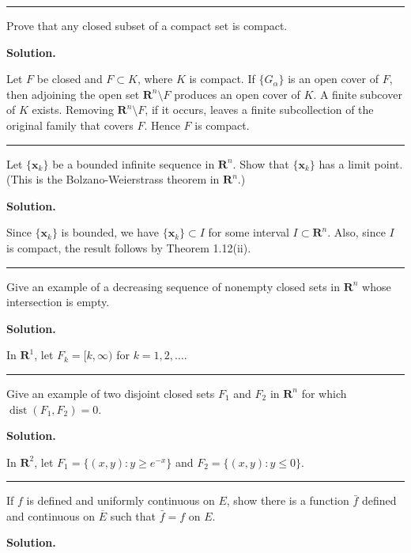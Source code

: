 \documentclass[12pt]{article}
\theoremstyle{definition}
\begin{document}
\bigskip\noindent\hrule\bigskip

Prove that any closed subset of a compact set is compact.

\smallskip
\noindent\textbf{Solution.}\quad

Let $F$ be closed and $F\subset K$, where $K$ is compact.  If $\{G_\alpha\}$ is an open cover of $F$, then adjoining the open set $\mathbf{R}^n\setminus F$ produces an open cover of $K$.  A finite subcover of $K$ exists.  Removing $\mathbf{R}^n\setminus F$, if it occurs, leaves a finite subcollection of the original family that covers $F$.  Hence $F$ is compact.



\bigskip\noindent\hrule\bigskip

Let $\{\mathbf{x}_k\}$ be a bounded infinite sequence in $\mathbf{R}^n$. Show that $\{\mathbf{x}_k\}$ has a limit point. (This is the Bolzano-Weierstrass theorem in $\mathbf{R}^n$.)

\smallskip
\noindent\textbf{Solution.}\quad

Since $\{\mathbf{x}_k\}$ is bounded, we have $\{\mathbf{x}_k\}\subset I$ for some interval $I\subset\mathbf{R}^n$. Also, since $I$ is compact, the result follows by Theorem 1.12(ii).



\bigskip\noindent\hrule\bigskip

Give an example of a decreasing sequence of nonempty closed sets in $\mathbf{R}^n$ whose intersection is empty.

\smallskip
\noindent\textbf{Solution.}\quad

In $\mathbf{R}^1$, let $F_k=[k,\infty)$ for $k=1,2,\ldots$.



\bigskip\noindent\hrule\bigskip

Give an example of two disjoint closed sets $F_1$ and $F_2$ in $\mathbf{R}^n$ for which $\operatorname{dist}(F_1,F_2)=0$.

\smallskip
\noindent\textbf{Solution.}\quad

In $\mathbf{R}^2$, let $F_1=\{(x,y):y\ge e^{-x}\}$ and $F_2=\{(x,y):y\le 0\}$.



\bigskip\noindent\hrule\bigskip

If $f$ is defined and uniformly continuous on $E$, show there is a function $\bar{f}$ defined and continuous on $\overline{E}$ such that $\bar{f}=f$ on $E$.

\smallskip
\noindent\textbf{Solution.}\quad
\end{document}
